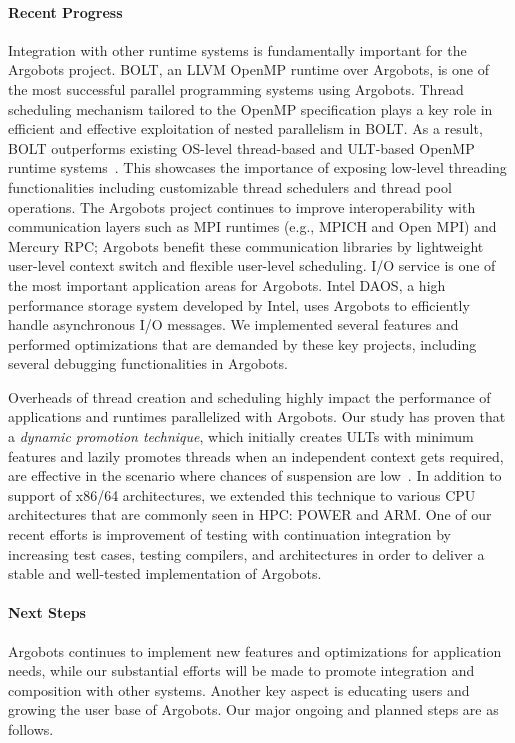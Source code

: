 \paragraph{Recent Progress}

Integration with other runtime systems is fundamentally important for
the Argobots project. BOLT, an LLVM OpenMP runtime over Argobots, is
one of the most successful parallel programming systems using
Argobots. Thread scheduling mechanism tailored to the OpenMP
specification plays a key role in efficient and effective exploitation
of nested parallelism in BOLT. As a result, BOLT outperforms existing
OS-level thread-based and ULT-based OpenMP runtime
systems~\cite{BOLT}. This showcases the importance of exposing
low-level threading functionalities including customizable thread
schedulers and thread pool operations. The Argobots project continues
to improve interoperability with communication layers such as MPI
runtimes (e.g., MPICH and Open MPI) and Mercury RPC; Argobots benefit
these communication libraries  by lightweight user-level context
switch and flexible user-level scheduling. I/O service is one of the
most important application areas for Argobots. Intel DAOS, a high
performance storage system developed by Intel, uses Argobots to
efficiently handle asynchronous I/O messages. We implemented several
features and performed optimizations that are demanded by these key
projects, including several debugging functionalities in Argobots.

Overheads of thread creation and scheduling highly impact the
performance of applications and runtimes parallelized with Argobots.
Our study has proven that a \textit{dynamic promotion technique},
which initially creates ULTs with minimum features and lazily promotes
threads when an independent context gets required, are effective in
the scenario where chances of suspension are low~\cite{iwasaki2018}.
In addition to support of x86/64 architectures, we extended this
technique to various CPU architectures that are commonly seen in HPC:
POWER and ARM. One of our recent efforts is improvement of testing
with continuation integration by increasing test cases, testing
compilers, and architectures in order to deliver a stable and
well-tested implementation of Argobots.

\paragraph{Next Steps}

Argobots continues to implement new features and optimizations for
application needs, while our substantial efforts will be made to
promote integration and composition with other systems. Another key
aspect is educating users and growing the user base of Argobots. Our
major ongoing and planned steps are as follows.

